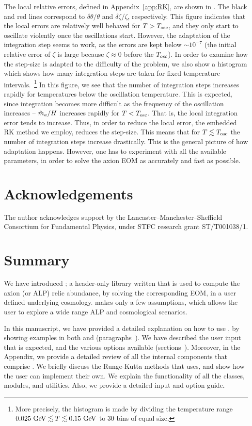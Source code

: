 \documentclass[11pt,a4paper]{article}
\begin{document}
%
The local relative errors, defined in Appendix~\ref{app:RK}, are shown in . The black and red lines correspond to $\delta \theta/\theta$ and $\delta \zeta/\zeta$, respectively. This figure indicates that the local errors are relatively well behaved for $T>T_{\rm osc}{}$, and they only start to oscillate violently once the oscillations start. However, the adaptation of the integration step seems to work, as the errors are kept below $\sim 10^{-7}$ (the initial relative error of $\zeta$ is large because $\zeta \approx 0$ before the $T_{\rm osc}{}$).  In order to examine how the step-size is adapted to the difficulty of the problem, we also show a histogram which shows how many integration steps are taken for fixed temperature intervals.~\footnote{More precisely, the histogram is made by dividing the temperature range $0.025~{\rm GeV}\lesssim T\lesssim 0.15~{\rm GeV}$ to $30$ bins of equal size.} 
%
In this figure, we see that the number of integration steps increases rapidly for temperatures below the oscillation temperature. 
%
This is expected, since integration becomes more difficult as the frequency of the oscillation increases -- $\tilde m_{a}{}/H$ increases rapidly for $T<T_{\rm osc}{}$. That is, the local integration error tends to increase. Thus, in order to reduce the local error, the embedded RK method we employ, reduces the step-size. This means that for $T \lesssim T_{\rm osc}{}$ the number of integration steps increase drastically.
%
This is the general picture of how adaptation happens. However, one has to experiment with all the available parameters, in order to solve the axion EOM as accurately and fast as possible.  

\section{Acknowledgements}
%
The author acknowledges support by the Lancaster–Manchester–Sheffield Consortium for Fundamental Physics, under STFC research grant ST/T001038/1.


\section{Summary}
%
We have introduced \mimes; a header-only library written \CPP that is used to compute the axion (or ALP) relic abundance, by solving the corresponding EOM, in a user defined underlying cosmology. \mimes makes only a few assumptions, which allows the user to explore a wide range ALP and cosmological scenarios. 

In this manuscript, we have provided a detailed explanation on how to use \mimes, by showing examples in both \CPP and \PY (paragraphs~). We have described the user input that is expected, and the various options available (sections~). Moreover, in the Appendix, we provide a detailed review of all the internal components that comprise \mimes. We briefly discuss the Runge-Kutta methods that \mimes uses, and show how the user can implement their own. We explain the functionality of all the classes, modules, and utilities. Also, we provide a detailed input and option guide.
\end{document}
